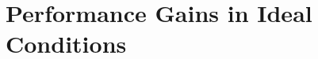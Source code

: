 \documentclass[lettersize,journal]{IEEEtran}
\begin{document}
%




 
 
 

 	
\section{Performance Gains in Ideal Conditions}\label{sec:OptKnown} 
\end{document}
